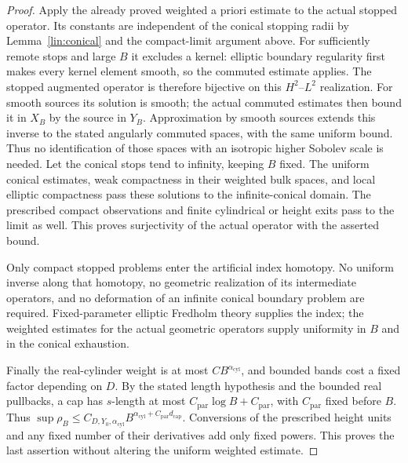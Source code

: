 \begin{proof}
Apply the already proved weighted a priori estimate to the actual
stopped operator. Its constants are independent of the conical
stopping radii by Lemma~\ref{lin:conical} and the compact-limit
argument above. For sufficiently remote stops and large $B$ it
excludes a kernel: elliptic boundary regularity
\cite[Chapter~1, Section~1, subsection~3, Theorem~1.5]{NP1994}
first makes every
kernel element smooth, so the commuted estimate applies. The stopped
augmented operator is therefore bijective on this $H^2$--$L^2$
realization. For smooth sources its solution is smooth; the actual
commuted estimates then bound it in $X_B$ by the source in $Y_B$.
Approximation by smooth sources extends this inverse to the stated
angularly commuted spaces, with the same uniform bound. Thus no
identification of those spaces with an isotropic higher Sobolev
scale is needed. Let the conical stops tend to infinity, keeping $B$
fixed. The uniform conical estimates, weak compactness in their
weighted bulk spaces, and local elliptic compactness pass these
solutions to the infinite-conical domain. The prescribed compact
observations and finite cylindrical or height exits pass to the
limit as well. This proves surjectivity of the actual operator
with the asserted bound.

Only compact stopped problems enter the artificial index homotopy.
No uniform inverse along that homotopy, no geometric realization
of its intermediate operators, and no deformation of an infinite
conical boundary problem are required. Fixed-parameter elliptic
Fredholm theory supplies the index; the weighted estimates for the
actual geometric operators supply uniformity in $B$ and in the
conical exhaustion.

Finally the real-cylinder weight is at most $CB^{\alpha_{\mathrm{cyl}}}$, and bounded bands
cost a fixed factor depending on $D$.  By the stated length hypothesis and
the bounded real pullbacks, a cap has $s$-length at most
$C_{\mathrm{par}}\log B+C_{\mathrm{par}}$, with $C_{\mathrm{par}}$ fixed
before $B$.  Thus
$\sup\rho_B\le C_{D,Y_0,\alpha_{\mathrm{cyl}}}
 B^{\alpha_{\mathrm{cyl}}+C_{\mathrm{par}}d_{\mathrm{cap}}}$.
Conversions of the prescribed height units and any fixed number of
their derivatives add only fixed powers.  This proves the last
assertion without altering the uniform weighted estimate.
\end{proof}

